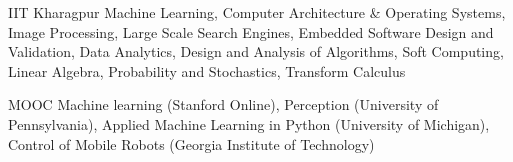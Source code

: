 

\begin{cvskills}

  \cvskill
    {IIT Kharagpur} %
    {Machine Learning, Computer Architecture \& Operating Systems, Image Processing, Large Scale Search
Engines, Embedded Software Design and Validation, Data Analytics, Design and Analysis of Algorithms, Soft Computing, Linear Algebra, Probability and Stochastics, Transform Calculus} %

  \cvskill
    {MOOC} %
    {Machine learning (Stanford Online), Perception (University of Pennsylvania), Applied Machine Learning in Python (University of Michigan), Control of Mobile Robots (Georgia Institute of Technology)} %


\end{cvskills}
